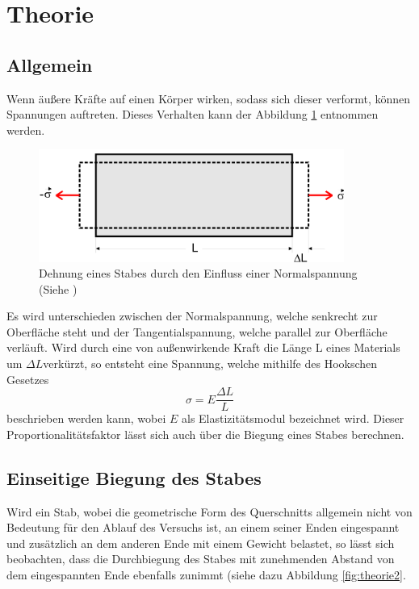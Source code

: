 \section{Theorie}
\label{sec:Theorie}

\subsection{Allgemein}

Wenn äußere Kräfte auf einen Körper wirken, sodass 
sich dieser verformt, können Spannungen auftreten.
Dieses Verhalten kann der Abbildung \ref{fig:theorie1}
entnommen werden.

\begin{figure}[h]
    \centering
    \includegraphics[width=10cm]{Theorie1.png}
    \caption{Dehnung eines Stabes durch den Einfluss einer Normalspannung (Siehe \cite{sample})}
      \label{fig:theorie1}
\end{figure}
\noindent
Es wird unterschieden zwischen der Normalspannung,
welche senkrecht zur Oberfläche steht und der 
Tangentialspannung, welche parallel zur Oberfläche 
verläuft. Wird durch eine von außenwirkende Kraft 
die Länge L eines Materials um $\Delta L $verkürzt, 
so entsteht eine Spannung, welche mithilfe
des Hookschen Gesetzes
\begin{equation}
    \sigma = E \frac{\Delta L}{L}
    \label{eq:1}
\end{equation}
\noindent beschrieben werden kann, wobei $E$ als
Elastizitätsmodul bezeichnet wird. Dieser 
Proportionalitätsfaktor lässt sich auch über die 
Biegung eines Stabes berechnen.


\subsection{Einseitige Biegung des Stabes}

Wird ein Stab, wobei die geometrische Form des 
Querschnitts allgemein nicht von Bedeutung für den
Ablauf des Versuchs ist, an einem seiner Enden
eingespannt und zusätzlich an dem anderen Ende mit 
einem Gewicht belastet, so lässt sich beobachten,
dass die Durchbiegung des Stabes mit zunehmenden
Abstand von dem eingespannten Ende ebenfalls 
zunimmt (siehe dazu Abbildung \ref{fig:theorie2}.

